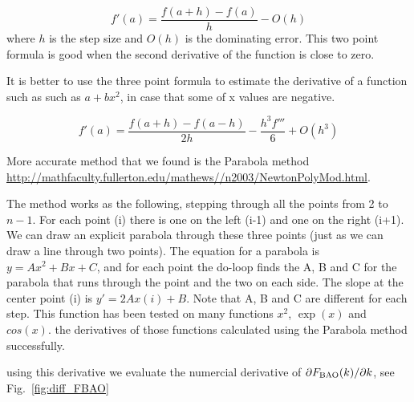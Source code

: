 \documentclass[10pt,a4paper]{article}
\begin{document}
\begin{equation}
f'(a)  =\frac{ f(a+h) - f(a) }{h} - O(h)
\end{equation} 
where $h$ is the step size and $O(h)$ is the dominating error. This two point formula is good when the second derivative of the function is close to zero. 

It is better to use the three point formula to estimate the derivative of a function  such as such as  $a + bx^2$,  in case that some of x  values are negative.

\begin{equation}
f'(a) = \frac{f(a+h) - f(a-h)}{2 h} - \frac{h^3 f'''}{6} + O(h^3)
\end{equation}

More accurate method that we found is the Parabola method
 \url{http://mathfaculty.fullerton.edu/mathews//n2003/NewtonPolyMod.html}.
 
The method works as the following, stepping  through all the points from 2 to $n-1$. For each point (i) there is one on the left (i-1) and one on the right (i+1). We can draw an explicit parabola through these three points (just as we can draw a line through two points). The equation for a parabola is $y = A x^2+B x+C$, and for each point the do-loop finds the A, B and C for the parabola that runs through the point and the two on each side. The slope at the center point (i) is $ y' = 2 A x(i) + B$. Note that A, B and C are different for each step. This function has been tested on many functions $x^2$, $\exp(x)$ and $cos(x)$. the derivatives of those functions calculated using the Parabola method successfully. 

using this derivative we evaluate the numercial derivative of $\partial  F_{\rm BAO}(k)/ \partial k$, see Fig.~\ref{fig:diff_FBAO}
\end{document}
